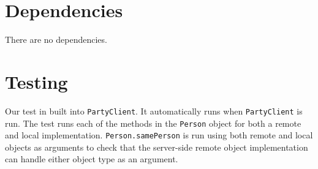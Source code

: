 \documentclass[12pt]{article}
\begin{document}

\section{Dependencies}

There are no dependencies.


\section{Testing}

Our test in built into \texttt{PartyClient}. It automatically runs when \texttt{PartyClient} is run. The test runs each of the methods in the \texttt{Person} object for both a remote and local implementation. \texttt{Person.samePerson} is run using both remote and local objects as arguments to check that the server-side remote object implementation can handle either object type as an argument.
\end{document}
